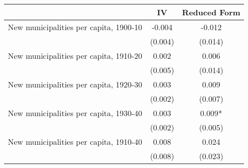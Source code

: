  \begin{tabular}{l*{2}{c}} \toprule
                &\multicolumn{1}{c}{IV}&\multicolumn{1}{c}{Reduced Form}\\
\midrule
New municipalities per capita, 1900-10&   -0.004   &   -0.012   \\
                &  (0.004)   &  (0.014)   \\
\addlinespace
New municipalities per capita, 1910-20&    0.002   &    0.006   \\
                &  (0.005)   &  (0.014)   \\
\addlinespace
New municipalities per capita, 1920-30&    0.003   &    0.009   \\
                &  (0.002)   &  (0.007)   \\
\addlinespace
New municipalities per capita, 1930-40&    0.003   &    0.009*  \\
                &  (0.002)   &  (0.005)   \\
\addlinespace
New municipalities per capita, 1910-40&    0.008   &    0.024   \\
                &  (0.008)   &  (0.023)   \\
 \bottomrule \end{tabular}
